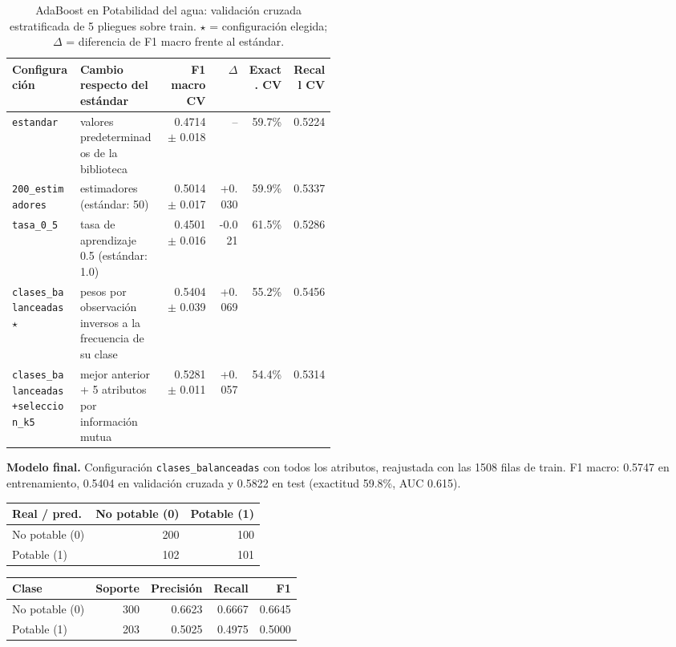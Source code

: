 \documentclass[11pt]{article}
\begin{document}
\begin{table}[H]\centering\footnotesize
\caption{AdaBoost en Potabilidad del agua: validación cruzada estratificada de 5 pliegues sobre train. $\star$ = configuración elegida; $\Delta$ = diferencia de F1 macro frente al estándar.}
\begin{tabular}{>{\raggedright\arraybackslash}p{0.21\linewidth}>{\raggedright\arraybackslash}p{0.26\linewidth}rrrr}\toprule
Configuración & Cambio respecto del estándar & F1 macro CV & $\Delta$ & Exact. CV & Recall CV \\ \midrule
\texttt{estandar} & valores predeterminados de la biblioteca & 0.4714 $\pm$ 0.018 & -- & 59.7\% & 0.5224 \\
\texttt{200\_\allowbreak{}estimadores} & 200 estimadores (estándar: 50) & 0.5014 $\pm$ 0.017 & +0.030 & 59.9\% & 0.5337 \\
\texttt{tasa\_\allowbreak{}0\_\allowbreak{}5} & tasa de aprendizaje 0.5 (estándar: 1.0) & 0.4501 $\pm$ 0.016 & -0.021 & 61.5\% & 0.5286 \\
\texttt{clases\_\allowbreak{}balanceadas} $\star$ & pesos por observación inversos a la frecuencia de su clase & 0.5404 $\pm$ 0.039 & +0.069 & 55.2\% & 0.5456 \\
\texttt{clases\_\allowbreak{}balanceadas+\allowbreak{}seleccion\_\allowbreak{}k5} & mejor anterior + 5 atributos por información mutua & 0.5281 $\pm$ 0.011 & +0.057 & 54.4\% & 0.5314 \\
\bottomrule\end{tabular}
\end{table}

\textbf{Modelo final.} Configuración \texttt{clases\_\allowbreak{}balanceadas} con todos los atributos, reajustada con las 1508 filas de train. F1 macro: 0.5747 en entrenamiento, 0.5404 en validación cruzada y 0.5822 en test (exactitud 59.8\%, AUC 0.615).

\begin{table}[H]\footnotesize\begin{minipage}[t]{0.44\linewidth}\centering{}\begin{tabular}{lrr}\toprule
Real / pred. & No potable (0) & Potable (1) \\ \midrule
No potable (0) & 200 & 100 \\
Potable (1) & 102 & 101 \\
\bottomrule\end{tabular}\end{minipage}\hfill\begin{minipage}[t]{0.52\linewidth}\centering{}\begin{tabular}{lrrrr}\toprule
Clase & Soporte & Precisión & Recall & F1 \\ \midrule
No potable (0) & 300 & 0.6623 & 0.6667 & 0.6645 \\
Potable (1) & 203 & 0.5025 & 0.4975 & 0.5000 \\
\bottomrule\end{tabular}\end{minipage}\end{table}
\end{document}
